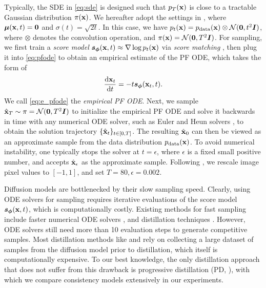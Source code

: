 Typically, the SDE in \cref{eq:sde} is designed such that $p_T({\mathbf{x}})$ is close to a tractable Gaussian distribution $\pi({\mathbf{x}})$. We hereafter adopt the settings in \citet{karras2022edm}, where $\bm{\mu}({\mathbf{x}}, t) = \bm{0}$ and $\sigma(t) = \sqrt{2t}$. In this case, we have $p_t({\mathbf{x}}) = p_\text{data}({\mathbf{x}}) \otimes \mathcal{N}(\bm{0}, t^2 {\bm{I}})$, where $\otimes$ denotes the convolution operation, and $\pi({\mathbf{x}}) = \mathcal{N}(\bm{0}, T^2{\bm{I}})$. For sampling, we first train a \emph{score model} ${\bm{s}}_{\bm{\phi}}({\mathbf{x}}, t) \approx \nabla \log p_t({\mathbf{x}})$ via \emph{score matching} \citep{hyvarinen2005estimation,vincent2011connection,song2019sliced,song2019generative,ho2020denoising}, then plug it into \cref{eq:pfode} to obtain an empirical estimate of the PF ODE, which takes the form of
\begin{align}
    \frac{\mathop{}\!\mathrm{d} {\mathbf{x}}_t}{\mathop{}\!\mathrm{d} t} = -t {\bm{s}}_{\bm{\phi}}({\mathbf{x}}_t, t). \label{eq:e_pfode}
\end{align}
We call \cref{eq:e_pfode} the \emph{empirical PF ODE}. Next, we sample $\hat{{\mathbf{x}}}_T \sim \pi = \mathcal{N}(\bm{0}, T^2 {\bm{I}})$ to initialize the empirical PF ODE and solve it backwards in time with any numerical ODE solver, such as Euler \citep{song2020denoising,song2021scorebased} and Heun solvers \citep{karras2022edm}, to obtain the solution trajectory $\{\hat{{\mathbf{x}}}_t\}_{t\in[0,T]}$. The resulting $\hat{{\mathbf{x}}}_0$ can then be viewed as an approximate sample from the data distribution $p_\text{data}({\mathbf{x}})$. To avoid numerical instability, one typically stops the solver at $t=\epsilon$, where $\epsilon$ is a fixed small positive number, and accepts $\hat{{\mathbf{x}}}_{\epsilon}$ as the approximate sample. Following \citet{karras2022edm}, we rescale image pixel values to $[-1,1]$, and set $T=80, \epsilon=0.002$.

Diffusion models are bottlenecked by their slow sampling speed. Clearly, using ODE solvers for sampling requires iterative evaluations of the score model ${\bm{s}}_{\bm{\phi}}({\mathbf{x}}, t)$, which is computationally costly. Existing methods for fast sampling include faster numerical ODE solvers \cite{song2020denoising,zhang2022fast,lu2022dpm,dockhorn2022genie}, and distillation techniques \cite{luhman2021knowledge,salimans2022progressive,meng2022distillation,zheng2022fast}. However, ODE solvers still need more than 10 evaluation steps to generate competitive samples. Most distillation methods like \citet{luhman2021knowledge} and \citet{zheng2022fast} rely on collecting a large dataset of samples from the diffusion model prior to distillation, which itself is computationally expensive. To our best knowledge, the only distillation approach that does not suffer from this drawback is progressive distillation (PD, \citet{salimans2022progressive}), with which we compare consistency models extensively in our experiments.
